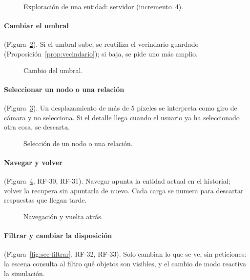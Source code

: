 \begin{figure}
  \centering
  \caption{Exploración de una entidad: servidor (incremento~4).}
  \label{fig:sec-explorar-servidor}
\end{figure}

\paragraph{Cambiar el umbral} (Figura~\ref{fig:sec-umbral}). Si el umbral sube, se reutiliza el vecindario guardado (Proposición~\ref{prop:vecindario}); si baja, se pide uno más amplio.

\begin{figure}[htbp]
  \centering
  \caption{Cambio del umbral.}
  \label{fig:sec-umbral}
\end{figure}

\paragraph{Seleccionar un nodo o una relación} (Figura~\ref{fig:sec-seleccionar}). Un desplazamiento de más de 5 píxeles se interpreta como giro de cámara y no selecciona. Si el detalle llega cuando el usuario ya ha seleccionado otra cosa, se descarta.

\begin{figure}[htbp]
  \centering
  \caption{Selección de un nodo o una relación.}
  \label{fig:sec-seleccionar}
\end{figure}

\paragraph{Navegar y volver} (Figura~\ref{fig:sec-navegar}, RF-30, RF-31). Navegar apunta la entidad actual en el historial; volver la recupera sin apuntarla de nuevo. Cada carga se numera para descartar respuestas que llegan tarde.

\begin{figure}[htbp]
  \centering
  \caption{Navegación y vuelta atrás.}
  \label{fig:sec-navegar}
\end{figure}

\paragraph{Filtrar y cambiar la disposición} (Figura~\ref{fig:sec-filtrar}, RF-32, RF-33). Solo cambian lo que se ve, sin peticiones: la escena consulta al filtro qué objetos son visibles, y el cambio de modo reactiva la simulación.

